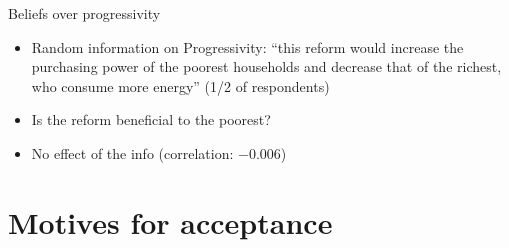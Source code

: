 \documentclass[aspectratio=169,9pt,dvipsnames]{beamer}
\begin{document}

 

    \begin{frame}{Beliefs over progressivity}\label{progreg_origin}

\begin{itemize}
        \item Random information on Progressivity: ``this reform would increase the purchasing power of the poorest households and decrease that of the richest, who consume more energy'' (1/2 of respondents) \medskip
        \item Is the reform beneficial to the poorest? \medskip \pause
        \item No effect of the info (correlation: $-$0.006)
\end{itemize}

 \medskip
 
\hyperlink{progreg_target}{}

    \end{frame}

\section{Motives for acceptance}


\end{document}
